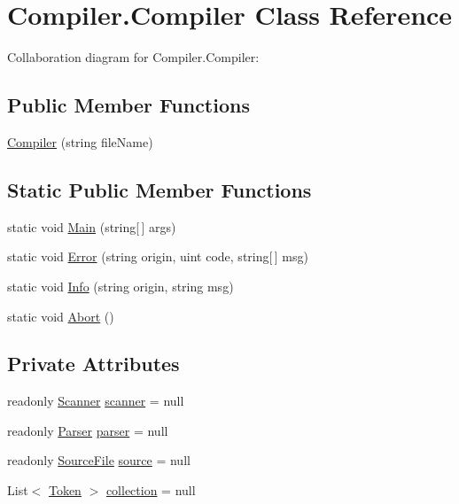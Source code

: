 \hypertarget{class_compiler_1_1_compiler}{}\section{Compiler.\+Compiler Class Reference}
\label{class_compiler_1_1_compiler}


Collaboration diagram for Compiler.\+Compiler\+:
\subsection*{Public Member Functions}
\begin{DoxyCompactItemize}
\item 
\mbox{\hyperlink{class_compiler_1_1_compiler_ab9ae50ccd497464301c3bd9acf5d1d89}{Compiler}} (string file\+Name)
\end{DoxyCompactItemize}
\subsection*{Static Public Member Functions}
\begin{DoxyCompactItemize}
\item 
static void \mbox{\hyperlink{class_compiler_1_1_compiler_aaa8629c1d8b60f4ad0e9771931b23471}{Main}} (string\mbox{[}$\,$\mbox{]} args)
\item 
static void \mbox{\hyperlink{class_compiler_1_1_compiler_af3467c4a37bb5379d3da14188042193c}{Error}} (string origin, uint code, string\mbox{[}$\,$\mbox{]} msg)
\item 
static void \mbox{\hyperlink{class_compiler_1_1_compiler_a1c4bba751de5a1ac6db0006cb6203ed4}{Info}} (string origin, string msg)
\item 
static void \mbox{\hyperlink{class_compiler_1_1_compiler_a483c40dbc9510bc702302e073ef789b8}{Abort}} ()
\end{DoxyCompactItemize}
\subsection*{Private Attributes}
\begin{DoxyCompactItemize}
\item 
readonly \mbox{\hyperlink{class_compiler_1_1_scanner}{Scanner}} \mbox{\hyperlink{class_compiler_1_1_compiler_a8ec56dd708f82bf4b16a074f7263e8f1}{scanner}} = null
\item 
readonly \mbox{\hyperlink{class_compiler_1_1_parser}{Parser}} \mbox{\hyperlink{class_compiler_1_1_compiler_a73660c59052687e1b4b92b7549dcd171}{parser}} = null
\item 
readonly \mbox{\hyperlink{class_compiler_1_1_source_file}{Source\+File}} \mbox{\hyperlink{class_compiler_1_1_compiler_a6096cba7dada5002eb07a626dc76cb89}{source}} = null
\item 
List$<$ \mbox{\hyperlink{class_compiler_1_1_token}{Token}} $>$ \mbox{\hyperlink{class_compiler_1_1_compiler_a8279f3629691412ae917e1760437d670}{collection}} = null
\end{DoxyCompactItemize}


